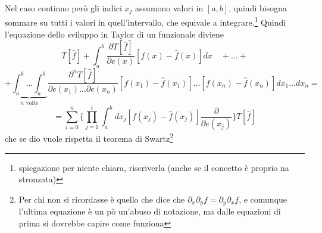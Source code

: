 \documentclass[11pt,a4paper]{article}
\theoremstyle{definition}
\theoremstyle{plain}
\theoremstyle{plain}
\begin{document}
		Nel caso continuo però gli indici $x_j$ assumono valori in $[a,b]$, quindi bisogna sommare su tutti i valori in quell'intervallo, che equivale a integrare.\footnote{spiegazione per niente chiara, riscriverla (anche se il concetto è proprio na stronzata)}\newline
		Quindi l'equazione dello sviluppo in Taylor di un funzionale diviene
		\begin{equation}
			T[\hat f]+\int_a^b \frac{\partial T[\hat f]}{\partial e(x)}[f(x)-\hat f(x)]dx\quad+\dots+
		\end{equation}
		\[
			+\underbrace{\int_a^b\dots\int_a^b}_{n\textrm{ volte}}
			\frac{\partial^n T[\hat f]}{\partial e(x_1)\dots\partial e(x_n)}[f(x_1)-\hat f(x_1)]\dots[f(x_n)-\hat f(x_n)]dx_1\dots dx_n=
		\]
		\begin{equation}
			=\sum_{i=0}^n \Bigg\{\prod_{j=1}^i \int_a^b dx_j[f(x_j)-\hat f(x_j)]\frac{\partial}{\partial e(x_j)}\Bigg\}T[\hat f]
		\end{equation}
		che se dio vuole rispetta il teorema di Swartz\footnote{Per chi non si ricordasse è quello che dice che $\partial_x\partial_y f=\partial_y\partial_x f$, e comunque l'ultima equazione è un pò un'abuso di notazione, ma dalle equazioni di prima si dovrebbe capire come funziona}
\end{document}
